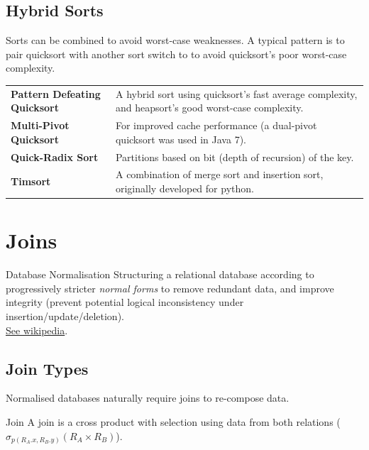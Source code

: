 \subsection{Hybrid Sorts}
Sorts can be combined to avoid worst-case weaknesses. A typical pattern is to pair quicksort with another sort switch to to avoid quicksort's poor worst-case complexity.
\begin{center}
    \begin{tabular}{l | p{}}
        \textbf{Pattern Defeating Quicksort} & A hybrid sort using quicksort's fast average complexity, and heapsort's good worst-case complexity. \\
        \textbf{Multi-Pivot Quicksort}       & For improved cache performance (a dual-pivot quicksort was used in Java 7).                         \\
        \textbf{Quick-Radix Sort}            & Partitions based on bit (depth of recursion) of the key.                                            \\
        \textbf{Timsort}                     & A combination of merge sort and insertion sort, originally developed for python.                    \\
    \end{tabular}
\end{center}

\section{Joins}
\begin{definitionbox}{Database Normalisation}
    Structuring a relational database according to progressively stricter \textit{normal forms} to remove redundant data, and improve integrity (prevent potential logical inconsistency under insertion/update/deletion).
    \\ \href{https://en.wikipedia.org/wiki/Database_normalization}{See wikipedia}.
\end{definitionbox}

\subsection{Join Types}
Normalised databases naturally require joins to re-compose data.

\begin{definitionbox}{Join}
    A join is a cross product with selection using data from both relations ($\sigma_{p(R_A.x, R_B.y)} (R_A \times R_B)$).
\end{definitionbox}

